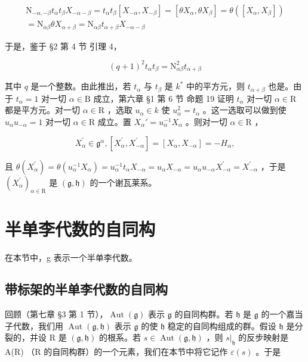 \[
\begin{array}{r} \mathrm{N} _ {- \alpha , - \beta} t _ {\alpha} t _ {\beta} X _ {- \alpha - \beta} = t _ {\alpha} t _ {\beta} [ X _ {- \alpha}, X _ {- \beta} ] = [ \theta X _ {\alpha}, \theta X _ {\beta} ] = \theta ([ X _ {\alpha}, X _ {\beta} ]) \\ = \mathrm{N} _ {\alpha \beta} \theta X _ {\alpha + \beta} = \mathrm{N} _ {\alpha \beta} t _ {\alpha + \beta} X _ {- \alpha - \beta} \end{array}
\]

于是，鉴于 §2 第 4 节 引理 4，

\[
(q + 1) ^ {2} t _ {\alpha} t _ {\beta} = \mathrm{N} _ {\alpha \beta} ^ {2} t _ {\alpha + \beta}
\]

其中 \(q\) 是一个整数。由此推出，若 \(t_{\alpha}\) 与 \(t_{\beta}\) 是 \(k^*\) 中的平方元，则 \(t_{\alpha + \beta}\) 也是。由于 \(t_{\alpha} = 1\) 对一切 \(\alpha \in \mathrm{B}\) 成立，第六章 §1 第 6 节 命题 19 证明 \(t_{\alpha}\) 对一切 \(\alpha \in \mathrm{R}\) 都是平方元。对一切 \(\alpha \in \mathrm{R}\) ，选取 \(u_{\alpha} \in k\) 使 \(u_{\alpha}^{2} = t_{\alpha}\) 。这一选取可以做到使 \(u_{\alpha}u_{-\alpha} = 1\) 对一切 \(\alpha \in \mathrm{R}\) 成立。置 \(X_{\alpha}' = u_{\alpha}^{-1}X_{\alpha}\) 。则对一切 \(\alpha \in \mathrm{R}\) ，

\[
X _ {\alpha} ^ {\prime} \in \mathfrak {g} ^ {\alpha}, [ X _ {\alpha} ^ {\prime}, X _ {- \alpha} ^ {\prime} ] = [ X _ {\alpha}, X _ {- \alpha} ] = - H _ {\alpha},
\]

且 \(\theta(X_{\alpha}^{\prime}) = \theta(u_{\alpha}^{-1}X_{\alpha}) = u_{\alpha}^{-1}t_{\alpha}X_{-\alpha} = u_{\alpha}X_{-\alpha} = u_{\alpha}u_{-\alpha}X_{-\alpha}^{\prime} = X_{-\alpha}^{\prime}\) ，于是 \((X_{\alpha}^{\prime})_{\alpha \in \mathrm{R}}\) 是 \((\mathfrak{g},\mathfrak{h})\) 的一个谢瓦莱系。

\section{半单李代数的自同构}

在本节中，g 表示一个半单李代数。

\subsection{带标架的半单李代数的自同构}

回顾（第七章 §3 第 1 节），\(\operatorname{Aut}(\mathfrak{g})\) 表示 \(\mathfrak{g}\) 的自同构群。若 \(\mathfrak{h}\) 是 \(\mathfrak{g}\) 的一个嘉当子代数，我们用 \(\operatorname{Aut}(\mathfrak{g},\mathfrak{h})\) 表示 \(\mathfrak{g}\) 的使 \(\mathfrak{h}\) 稳定的自同构组成的群。假设 \(\mathfrak{h}\) 是分裂的，并设 R 是 \((\mathfrak{g},\mathfrak{h})\) 的根系。若 \(s\in\operatorname{Aut}(\mathfrak{g},\mathfrak{h})\) ，则 \(s|_{\mathfrak{h}}\) 的反步映射是 A(R) （R 的自同构群）的一个元素，我们在本节中将它记作 \(\varepsilon(s)\) 。于是

